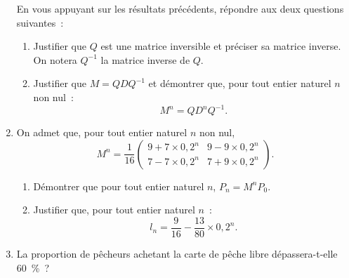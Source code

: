 \begin{enumerate}
\begin{center}
          \end{center}
     En vous appuyant sur les résultats précédents, répondre aux deux questions suivantes~:
     \begin{enumerate}[label=\alph*.]
          \item Justifier que $Q$ est une matrice inversible et préciser sa matrice inverse.\\
          On notera $Q^{-1}$ la matrice inverse de $Q$.
          \item Justifier que $M=QDQ^{-1}$ et démontrer que, pour tout entier naturel $n$ non nul~:
          \[M^n=QD^nQ^{-1}.\]
     \end{enumerate}
     \item On admet que, pour tout entier naturel $n$ non nul,
     \[
     M^n=\frac{1}{16}\begin{pmatrix}
          9+7\times0,2^n&9-9\times0,2^n\\
          7-7\times0,2^n&7+9\times0,2^n
     \end{pmatrix}.
     \]
     \begin{enumerate}[label=\alph*.]
          \item
          Démontrer que pour tout entier naturel $n$, $P_n=M^nP_0$.
          \item Justifier que, pour tout entier naturel $n$~:
          \[
          l_n=\frac{9}{16}-\frac{13}{80}\times0,2^n.
          \]
     \end{enumerate}
     \item La proportion de pêcheurs achetant la carte de pêche libre dépassera-t-elle 60~\%~?
\end{enumerate}

